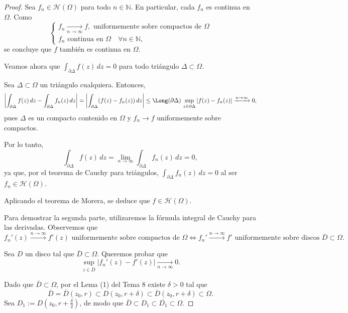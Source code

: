\begin{proof}
    Sea $f_n \in \mathcal{H}(\Omega)$ para todo $n \in \mathbb{N}$. En particular, cada $f_n$ es continua en $\Omega$. Como
    \[
        \begin{cases}
            f_n \xrightarrow[n \to \infty]{} f, \text{ uniformemente sobre compactos de }\Omega\\
            f_n \text{ continua en } \Omega \quad \forall n \in \mathbb{N},
        \end{cases}
    \]
    se concluye que $f$ también es continua en $\Omega$.

    Veamos ahora que $\displaystyle \int_{\partial \Delta} f(z)\,dz = 0$ para todo triángulo $\Delta \subset \Omega$.

    Sea $\Delta \subset \Omega$ un triángulo cualquiera. Entonces,
    \[
        \left| \int_{\partial \Delta} f(z)\,dz - \int_{\partial \Delta} f_n(z)\,dz \right|
        = \left| \int_{\partial \Delta} (f(z) - f_n(z))\,dz \right|
        \leq \Long(\partial \Delta)\, \sup_{z \in \partial \Delta} |f(z) - f_n(z)|
        \xrightarrow{n \to \infty} 0,
    \]
    pues $\Delta$ es un compacto contenido en $\Omega$ y $f_n \to f$ uniformemente sobre compactos.

    Por lo tanto,
    \[
        \int_{\partial \Delta} f(z)\,dz = \lim_{n \to \infty} \int_{\partial \Delta} f_n(z)\,dz = 0,
    \]
    ya que, por el teorema de Cauchy para triángulos, $\int_{\partial \Delta} f_n(z)\,dz = 0$ al ser $f_n \in \mathcal{H}(\Omega)$.

    Aplicando el teorema de Morera, se deduce que $f \in \mathcal{H}(\Omega)$.

    \vspace{0.2cm}
    Para demostrar la segunda parte, utilizaremos la fórmula integral de Cauchy para las derivadas. Observemos que
    \[
        f_n'(z) \xrightarrow{n \to \infty} f'(z) \text{ uniformemente sobre compactos de } \Omega
        \iff
        f_n' \xrightarrow{n \to \infty} f' \text{ uniformemente sobre discos } \overline{D} \subset \Omega.
    \]

    Sea $D$ un disco tal que $\overline{D} \subset \Omega$. Queremos probar que
    \[
        \sup_{z \in \overline{D}} |f_n'(z) - f'(z)| \xrightarrow[n \to \infty]{} 0.
    \]

    Dado que $\overline{D} \subset \Omega$, por el Lema (1) del Tema 8 existe $\delta > 0$ tal que
    \[
        \overline{D} = \overline{D}(z_0, r) \subset D(z_0, r + \delta) \subset \overline{D}(z_0, r + \delta) \subset \Omega.
    \]
    Sea $D_1 := D(z_0, r + \tfrac{\delta}{2})$, de modo que $\overline{D} \subset D_1 \subset \overline{D_1} \subset \Omega$.


\end{proof}

